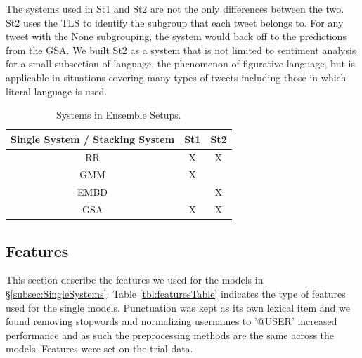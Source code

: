 \documentclass[11pt,letterpaper]{article}
\begin{document}
The systems used in {\sc St1} and {\sc St2} are not the only differences between the two. {\sc St2} uses the TLS to identify the subgroup that each tweet belongs to. For any tweet with the {\sc None} subgrouping, the system would back off to the predictions from the GSA. We built {\sc St2} as a system that is not limited to sentiment analysis for a small subsection of language, the phenomenon of figurative language, but is applicable in situations covering many types of tweets including those in which literal language is used.

\begin{table}[ht!]
\begin{center}
\begin{tabular}{c || c c}
Single System / Stacking System & {\sc St1} & {\sc St2}\\
\hline
{\sc RR} & X & X\\
{\sc GMM} & X & \\
{\sc EMBD} & &X\\
{\sc GSA} & X&X \\
\end{tabular}
\end{center}
\caption{Systems in Ensemble Setups.}
\label{tbl:stackingTable}
\end{table}

\subsection{Features}

\label{sec:Features}

This section describe the features we used for the models in \S \ref{subsec:SingleSystems}. Table \ref{tbl:featuresTable} indicates the type of features used for the single models. Punctuation was kept as its own lexical item and we found removing stopwords and normalizing usernames to '@USER'  increased performance and as such the preprocessing methods are the same across the models. Features were set on the trial data.%
\end{document}
